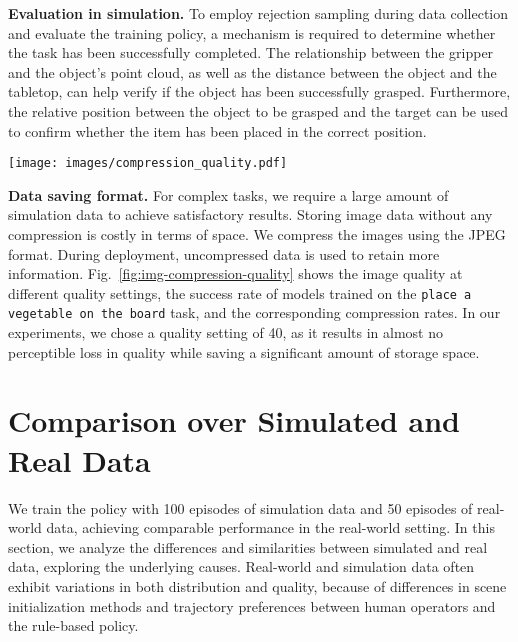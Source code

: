 \noindent\textbf{Evaluation in simulation.} To employ rejection sampling during data collection and evaluate the training policy, a mechanism is required to determine whether the task has been successfully completed. The relationship between the gripper and the object’s point cloud, as well as the distance between the object and the tabletop, can help verify if the object has been successfully grasped. Furthermore, the relative position between the object to be grasped and the target can be used to confirm whether the item has been placed in the correct position.  

\begin{figure*}[!htbp]
    \centering
    \texttt{[image: images/compression\_quality.pdf]}
    \caption{\textbf{Compression analysis.} Qualitative and quantitative analysis using third-person view images to demonstrate the impact of different JPEG quality parameters on image quality, task success rate, and compression ratio in the \texttt{place a vegetable on the board} task. The policies are trained on compressed data, but uncompressed data is used during deployment.}
    \label{fig:img-compression-quality}
\end{figure*}
\noindent\textbf{Data saving format.} 
For complex tasks, we require a large amount of simulation data to achieve satisfactory results. Storing image data without any compression is costly in terms of space. We compress the images using the JPEG format. During deployment, uncompressed data is used to retain more information. Fig.~\ref{fig:img-compression-quality} shows the image quality at different quality settings, the success rate of models trained on the \texttt{place a vegetable on the board} task, and the corresponding compression rates. In our experiments, we chose a quality setting of 40, as it results in almost no perceptible loss in quality while saving a significant amount of storage space.


\section{Comparison over Simulated and Real Data}
\label{sub:diff_sim_and_real}
We train the policy with 100 episodes of simulation data and 50 episodes of real-world data, achieving comparable performance in the real-world setting. In this section, we analyze the differences and similarities between simulated and real data, exploring the underlying causes. Real-world and simulation data often exhibit variations in both distribution and quality, because of differences in scene initialization methods and trajectory preferences between human operators and the rule-based policy.

